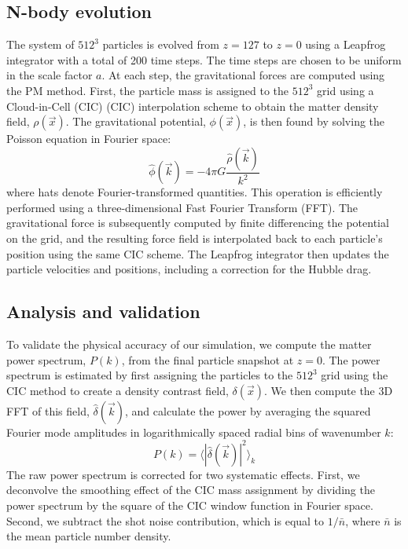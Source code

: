 \documentclass[]{article}
\begin{document}
\subsection{N-body evolution}
The system of $512^3$ particles is evolved from $z=127$ to $z=0$ using a Leapfrog integrator with a total of 200 time steps. The time steps are chosen to be uniform in the scale factor $a$. At each step, the gravitational forces are computed using the PM method. First, the particle mass is assigned to the $512^3$ grid using a Cloud-in-Cell (CIC) \citep{Hockney1981} (CIC) interpolation scheme to obtain the matter density field, $\rho(\vec{x})$. The gravitational potential, $\phi(\vec{x})$, is then found by solving the Poisson equation in Fourier space:
\begin{equation}
\hat{\phi}(\vec{k}) = -4 \pi G \frac{\hat{\rho}(\vec{k})}{k^2}
\end{equation}
where hats denote Fourier-transformed quantities. This operation is efficiently performed using a three-dimensional Fast Fourier Transform (FFT). The gravitational force is subsequently computed by finite differencing the potential on the grid, and the resulting force field is interpolated back to each particle's position using the same CIC scheme. The Leapfrog integrator then updates the particle velocities and positions, including a correction for the Hubble drag.

\subsection{Analysis and validation}
To validate the physical accuracy of our simulation, we compute the matter power spectrum, $P(k)$, from the final particle snapshot at $z=0$. The power spectrum is estimated by first assigning the particles to the $512^3$ grid using the CIC method to create a density contrast field, $\delta(\vec{x})$. We then compute the 3D FFT of this field, $\hat{\delta}(\vec{k})$, and calculate the power by averaging the squared Fourier mode amplitudes in logarithmically spaced radial bins of wavenumber $k$:
\begin{equation}
P(k) = \langle |\hat{\delta}(\vec{k})|^2 \rangle_{k}
\end{equation}
The raw power spectrum is corrected for two systematic effects. First, we deconvolve the smoothing effect of the CIC mass assignment by dividing the power spectrum by the square of the CIC window function in Fourier space. Second, we subtract the shot noise contribution, which is equal to $1/\bar{n}$, where $\bar{n}$ is the mean particle number density.
\end{document}
